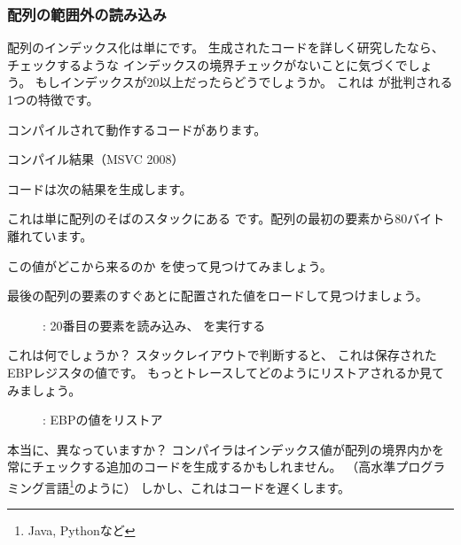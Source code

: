 ﻿\subsubsection{配列の範囲外の読み込み}

配列のインデックス化は単にです。
生成されたコードを詳しく研究したなら、チェックするような
インデックスの境界チェックがないことに気づくでしょう。
もしインデックスが20以上だったらどうでしょうか。
これは \CCpp が批判される1つの特徴です。

コンパイルされて動作するコードがあります。



コンパイル結果（MSVC 2008）



コードは次の結果を生成します。



これは単に配列のそばのスタックにある  です。配列の最初の要素から80バイト離れています。

\clearpage
\myindex{\olly}
この値がどこから来るのか \olly を使って見つけてみましょう。

最後の配列の要素のすぐあとに配置された値をロードして見つけましょう。

\begin{figure}[H]
\centering
{}
\caption{\olly: 20番目の要素を読み込み、 \printf を実行する}
\label{fig:array_BO_olly_r1}
\end{figure}

これは何でしょうか？
スタックレイアウトで判断すると、
これは保存されたEBPレジスタの値です。
\clearpage
もっとトレースしてどのようにリストアされるか見てみましょう。

\begin{figure}[H]
\centering
{}
\caption{\olly: EBPの値をリストア}
\label{fig:array_BO_olly_r2}
\end{figure}

本当に、異なっていますか？
コンパイラはインデックス値が配列の境界内かを常にチェックする追加のコードを生成するかもしれません。
（高水準プログラミング言語\footnote{Java, Pythonなど}のように）
しかし、これはコードを遅くします。
